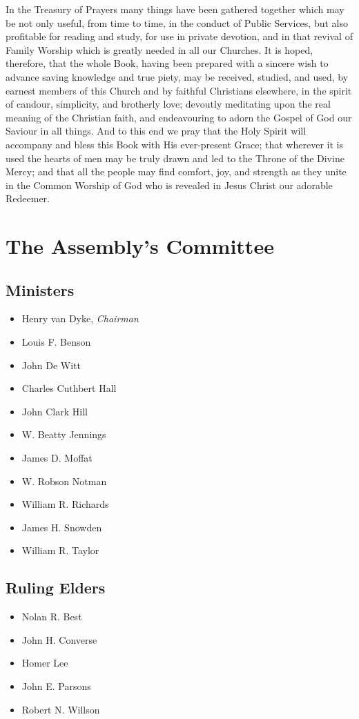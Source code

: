 In the Treasury of Prayers many things have been gathered together which may be not only useful, from time to time, in the conduct of Public Services, but also profitable for reading and study, for use in private devotion, and in that revival of Family Worship which is greatly needed in all our Churches.
It is hoped, therefore, that the whole Book, having been prepared with a sincere wish to advance saving knowledge and true piety, may be received, studied, and used, by earnest members of this Church and by faithful Christians elsewhere, in the spirit of candour, simplicity, and brotherly love; devoutly meditating upon the real meaning of the Christian faith, and endeavouring to adorn the Gospel of God our Saviour in all things.
And to this end we pray that the Holy Spirit will accompany and bless this Book with His ever-present Grace; that wherever it is used the hearts of men may be truly drawn and led to the Throne of the Divine Mercy; and that all the people may find comfort, joy, and strength as they unite in the Common Worship of God who is revealed in Jesus Christ our adorable Redeemer.
\clearpage
\section*{The Assembly's Committee}
\subsection*{Ministers}
\begin{itemize}
	\item Henry van Dyke, \textit{Chairman}
	\item Louis F. Benson
	\item John De Witt
	\item Charles Cuthbert Hall
	\item John Clark Hill
	\item W. Beatty Jennings
	\item James D. Moffat
	\item W. Robson Notman
	\item William R. Richards
	\item James H. Snowden
	\item William R. Taylor
\end{itemize}
\subsection*{Ruling Elders}
\begin{itemize}
	\item Nolan R. Best
	\item John H. Converse
	\item Homer Lee
	\item John E. Parsons
	\item Robert N. Willson
\end{itemize}
